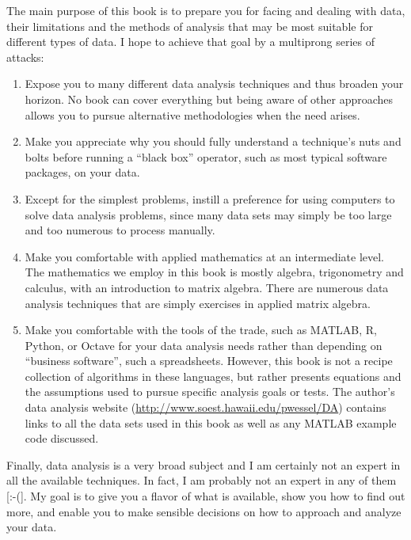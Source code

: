 The main purpose of this book is to prepare you for facing and dealing with data, their limitations and
the methods of analysis that may be most suitable for different types of data.  I hope to achieve that goal by
a multiprong series of attacks:

\begin{enumerate}
\item Expose you to many different data analysis techniques and thus broaden your horizon. No book can cover
   everything but being aware of other approaches allows you to pursue alternative
methodologies when the need arises.
\item Make you appreciate why you should fully understand a technique's nuts and bolts before running a ``black
   box'' operator, such as most typical software packages, on your data.
\item Except for the simplest problems, instill a preference for using computers to solve data
   analysis problems, since many data sets may simply be too large and too numerous to process manually.
\item Make you comfortable with applied mathematics at an intermediate level.  The mathematics we employ
   in this book is mostly algebra, trigonometry and calculus, with an introduction to matrix algebra.
   There are numerous data analysis techniques that are simply exercises in applied matrix algebra.
\item Make you comfortable with the tools of the trade, such as MATLAB, R, Python, or Octave for your data analysis needs
   rather than depending on ``business software'', such a spreadsheets.
   However, this book is not a recipe collection of algorithms in these languages, but rather presents equations and the
   assumptions used to pursue specific analysis goals or tests.  The author's data analysis website
   (\url{http://www.soest.hawaii.edu/pwessel/DA}) contains links to all the
   data sets used in this book as well as any MATLAB example code discussed.
\end{enumerate}

Finally, data analysis is a very broad subject and I am certainly not an expert in all the available
techniques. In fact, I am probably not an expert in any of them [:-(].  My goal is to give you a flavor
of what is available, show you how to find out more, and enable you to make sensible decisions on how
to approach and analyze your data.

